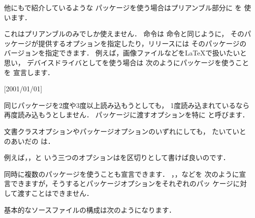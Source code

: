 {{{{{他にもで紹介しているような
パッケージを使う場合はプリアンブル部分に  を
使います．
\begin{Syntax}
%
\end{Syntax}
これはプリアンブルのみでしか使えません．
命令は 命令と同じように，
そのパッケージが提供するオプションを指定したり，リリースには
そのパッケージのバージョンを指定できます．
%
例えば，画像ファイルなどを{\LaTeX}で扱いたいと思い，
デバイスドライバとして\prog{\Dvipdfmx}を使う場合は
次のようにパッケージを使うことを
宣言します．

\begin{InTeX}
\usepackage[dvipdfmx]{graphicx}[2001/01/01]
\end{InTeX}

同じパッケージを2度や3度以上読み込もうとしても，
1度読み込まれているなら再度読み込もうとしません．
パッケージに渡すオプションを特に
と呼びます．

文書クラスオプションやパッケージオプションのいずれにしても，
たいていとのあいだの
は．


例えば\option{10pt}，，と
いう三つのオプションは\qu{\str,}を区切りとして書けば良いのです．

同時に複数のパッケージを使うことも宣言できます．
，，などを
次のように宣言できますが，そうするとパッケージオプションをそれぞれのパッ
ケージに対して渡すことはできません．

\begin{InTeX}
\usepackage{graphicx,amsmath,makeidx}
\end{InTeX}

基本的なソースファイルの構成は次のようになります．


}}}}}
